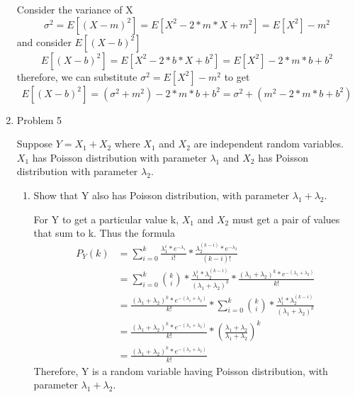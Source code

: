 \documentclass[letterpaper]{article}
\begin{document}
\begin{enumerate}
Consider the variance of X
\begin{equation}
\sigma^2 = E[(X-m)^2] = E[X^2 - 2*m*X + m^2] = E[X^2] - m^2
\end{equation}
and consider $E[(X - b)^2]$
\begin{equation}
E[(X - b)^2] = E[X^2 - 2*b*X + b^2] = E[X^2] - 2*m*b + b^2
\end{equation}
therefore, we can substitute $\sigma^2 = E[X^2] - m^2$ to get
\begin{equation}
E[(X - b)^2] = (\sigma^2 + m^2) - 2*m*b + b^2 = \sigma^2 + (m^2 - 2*m*b + b^2)
\end{equation}

\medskip
\newpage

\item{Problem 5}
\begin{mdframed}
Suppose $Y = X_1 + X_2$ where $X_1$ and $X_2$ are independent random variables. $X_1$ has Poisson distribution with parameter $\lambda_1$ and $X_2$ has Poisson distribution with parameter $\lambda_2$.
\end{mdframed}
\begin{enumerate}
\item{} Show that Y also has Poisson distribution, with parameter $\lambda_1 + \lambda_2$.

For Y to get a particular value k, $X_1$ and $X_2$ must get a pair of values that sum to k. Thus the formula
\begin{equation}
\begin{split}
P_Y(k) &= \sum_{i = 0}^{k}{\frac{\lambda_1^i * e^{-\lambda_1}}{i!} * \frac{\lambda_2^{(k - i)} * e^{-\lambda_2}}{(k - i)!}}\\
           &= \sum_{i = 0}^{k}{{k \choose i} * \frac{\lambda_1^i * \lambda_2^{(k - i)}}{(\lambda_1 + \lambda_2)^k} * \frac{(\lambda_1 + \lambda_2)^k * e^{-(\lambda_1 + \lambda_2)}}{k!}}\\
           &=  \frac{(\lambda_1 + \lambda_2)^k * e^{-(\lambda_1 + \lambda_2)}}{k!} * \sum_{i = 0}^{k}{{k \choose i} * \frac{\lambda_1^i * \lambda_2^{(k - i)}}{(\lambda_1 + \lambda_2)^k}}\\
           &=  \frac{(\lambda_1 + \lambda_2)^k * e^{-(\lambda_1 + \lambda_2)}}{k!} * (\frac{\lambda_1 + \lambda_2}{\lambda_1 + \lambda_2})^k\\
           &=  \frac{(\lambda_1 + \lambda_2)^k * e^{-(\lambda_1 + \lambda_2)}}{k!}
\end{split}
\end{equation}
Therefore, Y is a random variable having Poisson distribution, with parameter $\lambda_1 + \lambda_2$.


\end{enumerate}
\end{enumerate}
\end{document}
